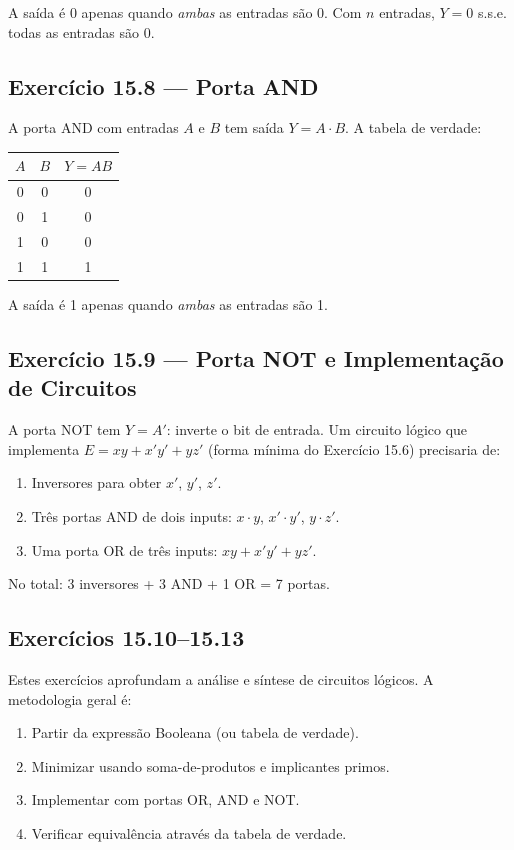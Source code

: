 \documentclass[12pt,a4paper]{article}
\begin{document}
A saída é 0 apenas quando \emph{ambas} as entradas são 0. Com $n$ entradas,
$Y = 0$ s.s.e. todas as entradas são 0.

\subsection*{Exercício 15.8 — Porta AND}

A porta AND com entradas $A$ e $B$ tem saída $Y = A \cdot B$. A tabela de verdade:

\begin{center}
\begin{tabular}{cc|c}
  \toprule
  $A$ & $B$ & $Y = AB$\\
  \midrule
  0 & 0 & 0\\
  0 & 1 & 0\\
  1 & 0 & 0\\
  1 & 1 & 1\\
  \bottomrule
\end{tabular}
\end{center}

A saída é 1 apenas quando \emph{ambas} as entradas são 1.

\subsection*{Exercício 15.9 — Porta NOT e Implementação de Circuitos}

A porta NOT tem $Y = A'$: inverte o bit de entrada.
Um circuito lógico que implementa $E = xy + x'y' + yz'$ (forma mínima do Exercício 15.6)
precisaria de:
\begin{enumerate}
  \item Inversores para obter $x'$, $y'$, $z'$.
  \item Três portas AND de dois inputs: $x \cdot y$, $x' \cdot y'$, $y \cdot z'$.
  \item Uma porta OR de três inputs: $xy + x'y' + yz'$.
\end{enumerate}
No total: 3 inversores + 3 AND + 1 OR = 7 portas.

\subsection*{Exercícios 15.10--15.13}

Estes exercícios aprofundam a análise e síntese de circuitos lógicos. A metodologia geral é:
\begin{enumerate}
  \item Partir da expressão Booleana (ou tabela de verdade).
  \item Minimizar usando soma-de-produtos e implicantes primos.
  \item Implementar com portas OR, AND e NOT.
  \item Verificar equivalência através da tabela de verdade.
\end{enumerate}
\end{document}
